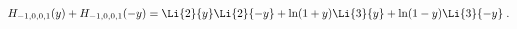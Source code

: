 \begin{equation}
\label{Hrel2}
H_{-1,0,0,1}(y) +  H_{-1,0,0,1}(-y) 
= \Li{2}{y} \Li{2}{-y}
+ \ln (1+y) \Li{3}{y}
+ \ln (1-y) \Li{3}{-y} \; .
\end{equation}

